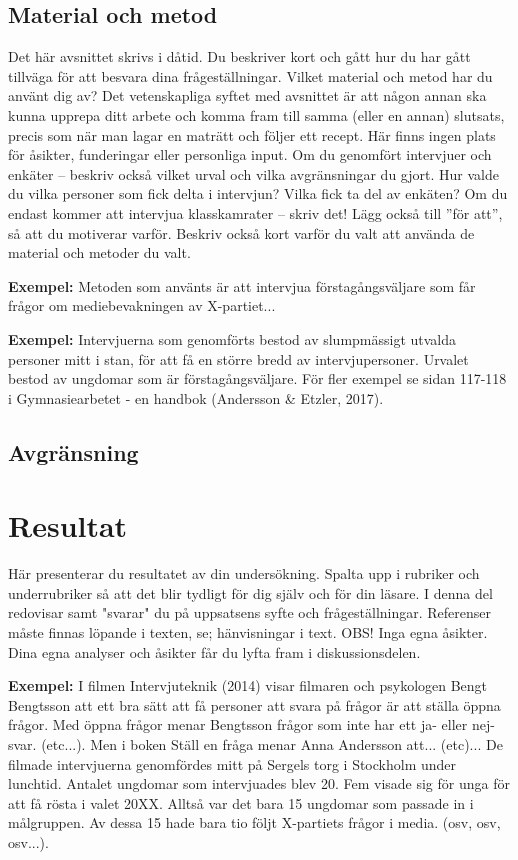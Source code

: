 \documentclass[11pt, a4paper, titlepage]{article}
\begin{document}
\subsection{Material och metod}
Det här avsnittet skrivs i dåtid. Du beskriver kort och gått hur du har gått tillväga för att besvara dina frågeställningar. Vilket material och metod har du använt dig av? Det vetenskapliga syftet med avsnittet är att någon annan ska kunna upprepa ditt arbete och komma fram till samma (eller en annan) slutsats, precis som när man lagar en maträtt och följer ett recept. Här finns ingen plats för åsikter, funderingar eller personliga input. Om du genomfört intervjuer och enkäter – beskriv också vilket urval och vilka avgränsningar du gjort. Hur valde du vilka personer som fick delta i intervjun? Vilka fick ta del av enkäten? Om du endast kommer att intervjua klasskamrater – skriv det! Lägg också till ”för att”, så att du motiverar varför. Beskriv också kort varför du valt att använda de material och metoder du valt. 

\textbf{Exempel:} 
Metoden som använts är att intervjua förstagångsväljare som får frågor om mediebevakningen av X-partiet... 

\textbf{Exempel:} 
Intervjuerna som genomförts bestod av slumpmässigt utvalda personer mitt i stan, för att få en större bredd av intervjupersoner. Urvalet bestod av ungdomar som är förstagångsväljare.
\newline\newline
För fler exempel se sidan 117-118 i Gymnasiearbetet - en handbok (Andersson \& Etzler, 2017).

\subsection{Avgränsning}

\newpage
\section{Resultat}
Här presenterar du resultatet av din undersökning. Spalta upp i rubriker och underrubriker så att det blir tydligt för dig själv och för din läsare. I denna del redovisar samt "svarar" du på uppsatsens syfte och frågeställningar. Referenser måste finnas löpande i texten, se; hänvisningar i text. OBS! Inga egna åsikter. Dina egna analyser och åsikter får du lyfta fram i diskussionsdelen.

\textbf{Exempel:} 
I filmen Intervjuteknik (2014) visar filmaren och psykologen Bengt Bengtsson att ett bra sätt att få personer att svara på frågor är att ställa öppna frågor. Med öppna frågor menar Bengtsson frågor som inte har ett ja- eller nej-svar. (etc...). Men i boken Ställ en fråga menar Anna Andersson att... (etc)... 
\newline\newline
De filmade intervjuerna genomfördes mitt på Sergels torg i Stockholm under lunchtid. Antalet ungdomar som intervjuades blev 20. Fem visade sig för unga för att få rösta i valet 20XX. Alltså var det bara 15 ungdomar som passade in i målgruppen. Av dessa 15 hade bara tio följt X-partiets frågor i media. (osv, osv, osv...).
\end{document}
